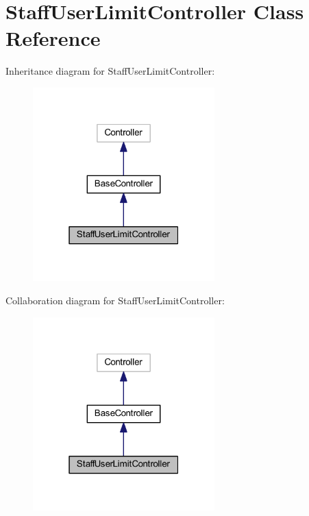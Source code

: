 \hypertarget{class_staff_user_limit_controller}{}\section{Staff\+User\+Limit\+Controller Class Reference}
\label{class_staff_user_limit_controller}


Inheritance diagram for Staff\+User\+Limit\+Controller\+:
\nopagebreak
\begin{figure}[H]
\begin{center}
\leavevmode
\includegraphics[width=199pt]{class_staff_user_limit_controller__inherit__graph}
\end{center}
\end{figure}


Collaboration diagram for Staff\+User\+Limit\+Controller\+:
\nopagebreak
\begin{figure}[H]
\begin{center}
\leavevmode
\includegraphics[width=199pt]{class_staff_user_limit_controller__coll__graph}
\end{center}
\end{figure}
